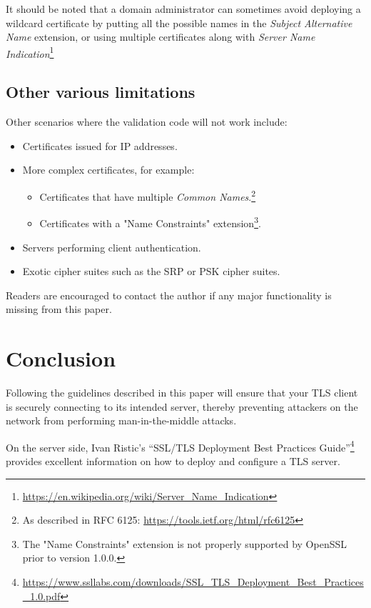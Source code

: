 \documentclass{article}
\begin{document}
It should be noted that a domain administrator can sometimes avoid deploying a wildcard
certificate by putting all the possible names in the 
{\em Subject Alternative Name} extension, or using multiple certificates along 
with {\em Server Name Indication}\footnote{\url{https://en.wikipedia.org/wiki/Server_Name_Indication}}


\subsection{Other various limitations} 

Other scenarios where the validation code will not work include:

\begin{itemize}
    \item Certificates issued for IP addresses.
    \item More complex certificates, for example:
    \begin{itemize}
        \item Certificates that have multiple 
        {\em Common Names}.\footnote{As described in RFC 6125: 
            \url{https://tools.ietf.org/html/rfc6125}}
        \item Certificates with a "Name Constraints" 
            extension\footnote{The "Name Constraints" extension is not properly supported by OpenSSL prior to version 1.0.0.}.
    \end{itemize}
    \item Servers performing client authentication.
    \item Exotic cipher suites such as the SRP or PSK cipher suites.
\end{itemize}

Readers are encouraged to contact the author if any major functionality is
missing from this paper.

\section{Conclusion}

Following the guidelines described in this paper will ensure that your TLS
client is securely connecting to its intended server, thereby preventing 
attackers on the network from performing man-in-the-middle attacks.

On the server side, Ivan Ristic's ``SSL/TLS Deployment Best Practices 
Guide''\footnote{\url{https://www.ssllabs.com/downloads/SSL_TLS_Deployment_Best_Practices_1.0.pdf}}
provides excellent information on how to deploy and configure a TLS server.
\end{document}
